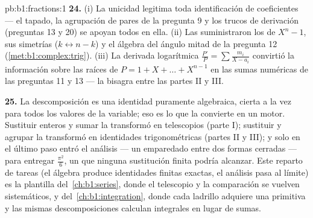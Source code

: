 \begin{solution}{pb:b1:fractions:1}
\textbf{24.} (i) La unicidad legitima toda identificación de
coeficientes --- el tapado, la agrupación de pares  de la
pregunta 9 y los trucos de derivación (preguntas 13 y 20) se apoyan
todos en ella. (ii) Las  suministraron los  de
$X^n - 1$, sus simetrías ($k \leftrightarrow n-k$) y el álgebra del
ángulo mitad de la pregunta 12 (\cref{met:b1:complex:trig}). (iii) La
derivada logarítmica $\frac{P'}P = \sum\frac{m_i}{X-a_i}$ convirtió la
información sobre las raíces de $P = 1 + X + \dots + X^{n-1}$ en las
sumas numéricas de las preguntas 11 y 13 --- la bisagra entre las
partes II y III.

\textbf{25.} La descomposición es una identidad puramente algebraica,
cierta a la vez para todos los valores de la variable; eso es lo que la
convierte en un motor. Sustituir enteros y sumar la transformó en
telescopios (parte I); sustituir  y agrupar
 la transformó en identidades trigonométricas (partes II y
III); y solo en el último paso entró el análisis --- un emparedado
entre dos formas cerradas --- para entregar $\frac{\pi^2}6$, un
 que ninguna sustitución finita podría alcanzar. Este reparto
de tareas (el álgebra produce identidades finitas exactas, el análisis
pasa al límite) es la plantilla del~\cref{ch:b1:series}, donde el
telescopio y la comparación se vuelven sistemáticos, y
del~\cref{ch:b1:integration}, donde cada ladrillo adquiere una
primitiva y las mismas descomposiciones calculan integrales en lugar de
sumas.
\end{solution}
